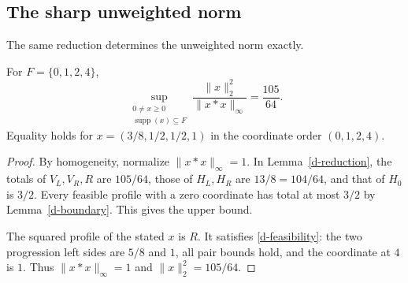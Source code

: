 \subsection{The sharp unweighted norm}

The same reduction determines the unweighted norm exactly.

\begin{proposition}\label{d-sharp-norm}
For $F=\{0,1,2,4\}$,
\begin{equation}\label{d-norm-value}
\sup_{\substack{0\ne x\geq0\\ \operatorname{supp}(x)\subseteq F}}
\frac{\|x\|_2^2}{\|x*x\|_\infty}=\frac{105}{64}.
\end{equation}
Equality holds for $x=(3/8,1/2,1/2,1)$ in the coordinate order
$(0,1,2,4)$.
\end{proposition}

\begin{proof}
By homogeneity, normalize $\|x*x\|_\infty=1$. In
Lemma~\ref{d-reduction}, the totals of $V_L,V_R,R$ are $105/64$,
those of $H_L,H_R$ are $13/8=104/64$, and that of $H_0$ is $3/2$.
Every feasible profile with a zero coordinate has total at most $3/2$
by Lemma~\ref{d-boundary}. This gives the upper bound.

The squared profile of the stated $x$ is $R$. It satisfies
\eqref{d-feasibility}: the two progression left sides are $5/8$ and
$1$, all pair bounds hold, and the coordinate at $4$ is $1$.
Thus $\|x*x\|_\infty=1$ and $\|x\|_2^2=105/64$.
\end{proof}
